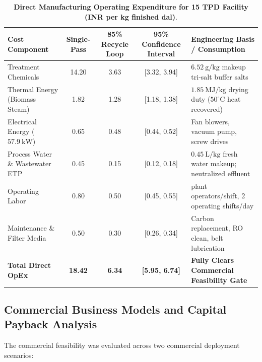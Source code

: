 \documentclass[10pt,a4paper]{article}
\newcommand{\inr}{\text{INR~}}
\begin{document}
\begin{table}[H]
\centering
\footnotesize
\setlength{\tabcolsep}{3.5pt}
\caption{\textbf{Direct Manufacturing Operating Expenditure for 15 TPD Facility (INR per kg finished dal)}.}
\label{tab:opex_detailed_q1_exp}
\begin{tabularx}{\linewidth}{p{3.8cm}ccc>{\raggedright\arraybackslash}X}
\toprule
\textbf{Cost Component} & \textbf{Single-Pass} & \textbf{85\% Recycle Loop} & \textbf{95\% Confidence Interval} & \textbf{Engineering Basis / Consumption} \\
\midrule
Treatment Chemicals & \inr14.20 & \inr3.63 & [\inr3.32, \inr3.94] & $6.52\ \mathrm{g/kg}$ makeup tri-salt buffer salts \\
Thermal Energy (Biomass Steam) & \inr1.82 & \inr1.28 & [\inr1.18, \inr1.38] & $1.85\ \mathrm{MJ/kg}$ drying duty ($50^\circ\mathrm{C}$ heat recovered) \\
Electrical Energy ($57.9\ \mathrm{kW}$) & \inr0.65 & \inr0.48 & [\inr0.44, \inr0.52] & Fan blowers, vacuum pump, screw drives \\
Process Water \& Wastewater ETP & \inr0.45 & \inr0.15 & [\inr0.12, \inr0.18] & $0.45\ \mathrm{L/kg}$ fresh water makeup; neutralized effluent \\
Operating Labor & \inr0.80 & \inr0.50 & [\inr0.45, \inr0.55] & 3 plant operators/shift, 2 operating shifts/day \\
Maintenance \& Filter Media & \inr0.50 & \inr0.30 & [\inr0.26, \inr0.34] & Carbon replacement, RO clean, belt lubrication \\
\midrule
\textbf{Total Direct OpEx} & \textbf{\inr18.42} & \textbf{\inr6.34} & \textbf{[\inr5.95, \inr6.74]} & \textbf{Fully Clears Commercial Feasibility Gate} \\
\bottomrule
\end{tabularx}
\end{table}

\subsection{Commercial Business Models and Capital Payback Analysis}
The commercial feasibility was evaluated across two commercial deployment scenarios:
\end{document}
